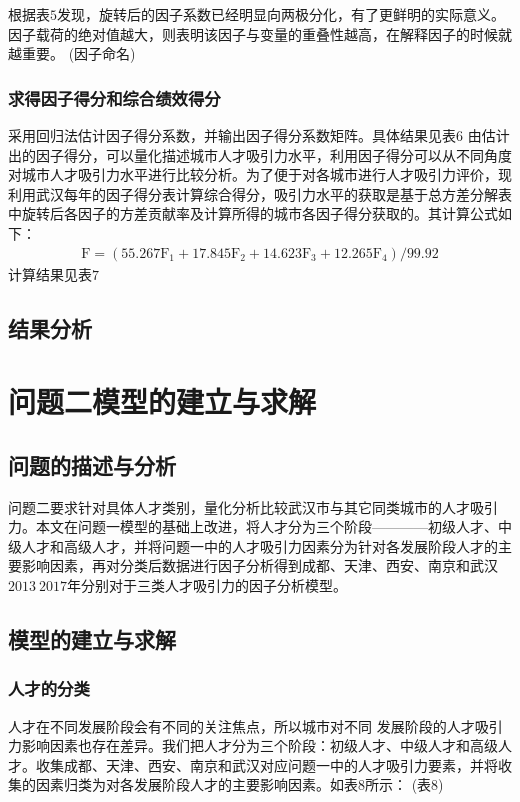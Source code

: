 \documentclass{whutmod}
\begin{document}
	根据表$5$发现，旋转后的因子系数已经明显向两极分化，有了更鲜明的实际意义。因子载荷的绝对值越大，则表明该因子与变量的重叠性越高，在解释因子的时候就越重要。
	(因子命名)
	\subsubsection{求得因子得分和综合绩效得分}
	采用回归法估计因子得分系数，并输出因子得分系数矩阵。具体结果见表$6$
	由估计出的因子得分，可以量化描述城市人才吸引力水平，利用因子得分可以从不同角度对城市人才吸引力水平进行比较分析。为了便于对各城市进行人才吸引力评价，现利用武汉每年的因子得分表计算综合得分，吸引力水平的获取是基于总方差分解表中旋转后各因子的方差贡献率及计算所得的城市各因子得分获取的。其计算公式如下：
	\begin{gather}
	\mathrm { F } = \left( 55.267 \mathrm { F } _ { 1 } + 17.845 \mathrm { F } _ { 2 } + 14.623 \mathrm { F } _ { 3 } + 12.265 \mathrm { F } _ { 4 } \right) / 99.92
	\end{gather}
	计算结果见表$7$
	\subsection{结果分析}
	
	\section{问题二模型的建立与求解}
	\subsection{问题的描述与分析}
	问题二要求针对具体人才类别，量化分析比较武汉市与其它同类城市的人才吸引力。本文在问题一模型的基础上改进，将人才分为三个阶段————初级人才、中级人才和高级人才，并将问题一中的人才吸引力因素分为针对各发展阶段人才的主要影响因素，再对分类后数据进行因子分析得到成都、天津、西安、南京和武汉$2013~2017$年分别对于三类人才吸引力的因子分析模型。
	\subsection{模型的建立与求解}
	\subsubsection{人才的分类}
	人才在不同发展阶段会有不同的关注焦点，所以城市对不同	发展阶段的人才吸引力影响因素也存在差异。我们把人才分为三个阶段：初级人才、中级人才和高级人才。收集成都、天津、西安、南京和武汉对应问题一中的人才吸引力要素，并将收集的因素归类为对各发展阶段人才的主要影响因素。如表$8$所示：
	(表8)
\end{document}
